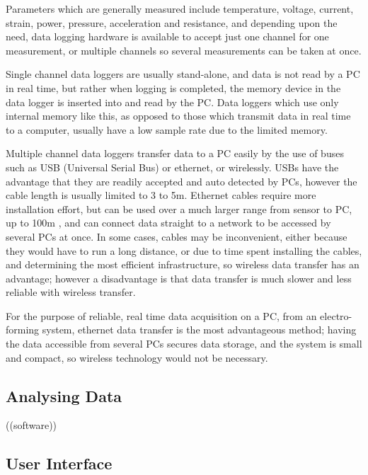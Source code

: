 Parameters which are generally measured include temperature, voltage, current, strain, power, pressure, acceleration and resistance, and depending upon the need, data logging hardware is available to accept just one channel for one measurement, or multiple channels so several measurements can be taken at once. 

Single channel data loggers are usually stand-alone, and data is not read by a PC in real time, but rather when logging is completed, the memory device in the data logger is inserted into and read by the PC. Data loggers which use only internal memory like this, as opposed to those which transmit data in real time to a computer, usually have a low sample rate due to the limited memory.

Multiple channel data loggers transfer data to a PC easily by the use of buses such as USB (Universal Serial Bus) or ethernet, or wirelessly. USBs have the advantage that they are readily accepted and auto detected by PCs, however the cable length is usually limited to 3 to 5m. Ethernet cables require more installation effort, but can be used over a much larger range from sensor to PC, up to 100m \cite{NatInstruments}, and can connect data straight to a network to be accessed by several PCs at once. In some cases, cables may be inconvenient, either because they would have to run a long distance, or due to time spent installing the cables, and determining the most efficient infrastructure, so wireless data transfer has an advantage; however a disadvantage is that data transfer is much slower and less reliable with wireless transfer.

For the purpose of reliable, real time data acquisition on a PC, from an electro-forming system, ethernet data transfer is the most advantageous method; having the data accessible from several PCs secures data storage, and the system is small and compact, so wireless technology would not be necessary. 
 
\subsection{Analysing Data}  ((software))

\subsection{User Interface}

